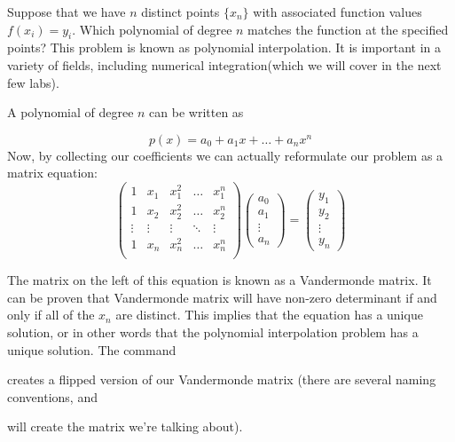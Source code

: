 \label{lab:Barycentric}

Suppose that we have $n$ distinct points $\{x_n\}$ with associated function values $f(x_i) = y_i$. Which polynomial of degree $n$ matches the function at the specified points? This problem is known as polynomial interpolation. It is important in a variety of fields, including numerical integration(which we will cover in the next few labs).

A polynomial of degree $n$ can be written as

\[
p(x) = a_0 + a_1 x + \ldots + a_n x^n
\]
Now, by collecting our coefficients we can actually reformulate our problem as a matrix equation:
\[
\begin{pmatrix}
1 & x_1 & x_1^2 & \ldots & x_1^n \\
1 & x_2 & x_2^2 & \ldots & x_2^n \\
\vdots & \vdots & \vdots & \ddots & \vdots \\
1 & x_n & x_n^2 & \ldots & x_n^n \\
\end{pmatrix} \begin{pmatrix}
a_0 \\
a_1 \\
\vdots \\
a_n
\end{pmatrix} = \begin{pmatrix} y_1 \\ y_2 \\ \vdots \\ y_n \end{pmatrix}
\]

The matrix on the left of this equation is known as a Vandermonde matrix. It can be proven that Vandermonde matrix will have non-zero determinant if and only if  all of the $x_n$ are distinct. This implies that the equation has a unique solution, or in other words that the polynomial interpolation problem has a unique solution. The command \begin{matlab}\end{matlab}\begin{python}\end{python} creates a flipped version of our Vandermonde matrix (there are several naming conventions, and \begin{matlab}\end{matlab}\begin{python}\end{python} will create the matrix we're talking about).

